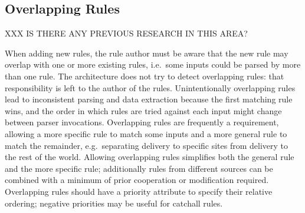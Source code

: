 \subsection{Overlapping Rules}

\label{overlapping rules in architecture}

XXX IS THERE ANY PREVIOUS RESEARCH IN THIS AREA\@?

When adding new rules, the rule author must be aware that the new rule may
overlap with one or more existing rules, i.e.\ some inputs could be parsed
by more than one rule.  The architecture does not try to detect overlapping
rules: that responsibility is left to the author of the rules.
Unintentionally overlapping rules lead to inconsistent parsing and data
extraction because the first matching rule wins, and the order in which
rules are tried against each input might change between parser invocations.
Overlapping rules are frequently a requirement, allowing a more specific
rule to match some inputs and a more general rule to match the remainder,
e.g.\ separating  delivery to specific sites from
 delivery to the rest of the world.  Allowing overlapping
rules simplifies both the general rule and the more specific rule;
additionally rules from different sources can be combined with a minimum of
prior cooperation or modification required.  Overlapping rules should have
a priority attribute to specify their relative ordering; negative
priorities may be useful for catchall rules.

